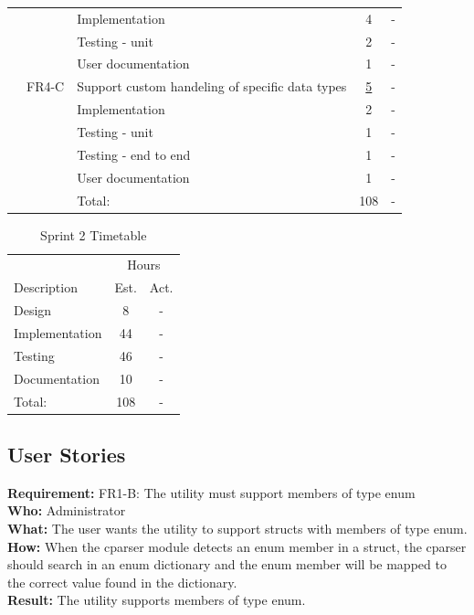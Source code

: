 \begin{table}[!ht]
\begin{tabularx}{\textwidth}{l l X c c}
	   &  & Implementation			   	& 4 & -\\
	   &  & Testing - unit				   	& 2 & -\\
	   &  & User documentation			& 1 & -\\
	\addlinespace
	13 & FR4-C & Support custom handeling of specific data types & \underline{ 5 } & - \\
	   &  & Implementation			   	& 2 & -\\
	   &  & Testing - unit				   	& 1 & -\\
	   &  & Testing - end to end			& 1 & -\\
	   &  & User documentation			& 1 & -\\
	\midrule
	& & Total: & 108  & - \\
	\bottomrule
\end{tabularx}
\end{table}



\begin{table}[!ht] \small \center
\caption{Sprint 2 Timetable\label{tab:sprint2time}}
\begin{tabularx}{\textwidth}{X c c}
	\toprule
	& \multicolumn{2}{c}{Hours} \\
	\cmidrule(r){2-3}
	Description & Est. & Act. \\
	\midrule
	Design & 8 & -\\
	\addlinespace
	Implementation & 44 & - \\
	\addlinespace
	Testing & 46 & -\\
	\addlinespace
	Documentation & 10 & -\\
	\midrule
	Total: & 108 & - \\
	\bottomrule
\end{tabularx}
\end{table}

\subsection{User Stories}

\textbf{Requirement:} FR1-B: The utility must support members of type enum\\
\textbf{Who:} Administrator\\
\textbf{What:} The user wants the utility to support structs with members of type enum.\\
\textbf{How:} When the cparser module detects an enum member in a struct, the cparser should search in an enum dictionary and the enum member will be mapped to the correct value found in the dictionary. \\
\textbf{Result:} The utility supports members of type enum.\\




